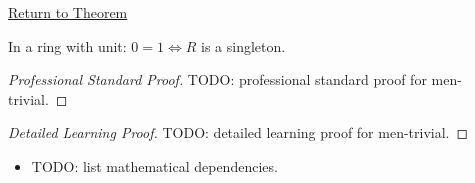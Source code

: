 \newpage
{}
\label{prf:men-trivial}

\begin{remark*}[Return]
\hyperref[thm:men-trivial]{Return to Theorem}
\end{remark*}

\begin{theorem*}
In a ring with unit: $0=1 \Longleftrightarrow R$ is a singleton.
\end{theorem*}

\begin{proof}[Professional Standard Proof]
\LRAProofBodyStart
TODO: professional standard proof for men-trivial.
\end{proof}

\begin{proof}[Detailed Learning Proof]
\LRAProofBodyStart
TODO: detailed learning proof for men-trivial.
\end{proof}

\begin{remark*}
\end{remark*}

\begin{dependencies}
\begin{itemize}
  \item TODO: list mathematical dependencies.
\end{itemize}
\end{dependencies}

\clearpage
